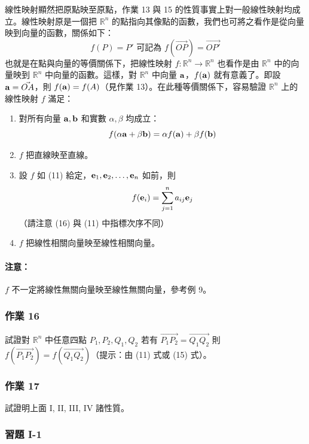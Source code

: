 線性映射顯然把原點映至原點，作業 13 與 15 的性質事實上對一般線性映射均成立。線性映射原是一個把 $\mathbb{R}^n$ 的點指向其像點的函數，我們也可將之看作是從向量映到向量的函數，關係如下：
\[ f(P)=P' \text{ 可記為 } f(\vec{OP}) = \vec{OP'} \]
也就是在點與向量的等價關係下，把線性映射 $f: \mathbb{R}^n \longrightarrow \mathbb{R}^n$ 也看作是由 $\mathbb{R}^n$ 中的向量映到 $\mathbb{R}^n$ 中向量的函數。這樣，對 $\mathbb{R}^n$ 中向量 $\boldsymbol{\mathbf{a}}$，$f(\boldsymbol{\mathbf{a}})$ 就有意義了。即設 $\boldsymbol{\mathbf{a}}=\vec{OA}$，則 $f(\boldsymbol{\mathbf{a}}) = f(A)$（見作業 13）。在此種等價關係下，容易驗證 $\mathbb{R}^n$ 上的線性映射 $f$ 滿足：
\begin{enumerate}[label=\Roman*., leftmargin=2.5em]
  \item 對所有向量 $\boldsymbol{\mathbf{a}}, \boldsymbol{\mathbf{b}}$ 和實數 $\alpha, \beta$ 均成立：
  \begin{equation}
  f(\alpha\boldsymbol{\mathbf{a}} + \beta\boldsymbol{\mathbf{b}}) = \alpha f(\boldsymbol{\mathbf{a}}) + \beta f(\boldsymbol{\mathbf{b}}) \label{eq:b6-1-1-15}
  \end{equation}
  \item $f$ 把直線映至直線。
  \item 設 $f$ 如 (11) 給定，$\boldsymbol{\mathbf{e}}_1, \boldsymbol{\mathbf{e}}_2, \dots, \boldsymbol{\mathbf{e}}_n$ 如前，則
  \begin{equation}
  f(\boldsymbol{\mathbf{e}}_i) = \sum_{j=1}^n a_{ij} \boldsymbol{\mathbf{e}}_j \label{eq:b6-1-1-16}
  \end{equation}
  （請注意 (16) 與 (11) 中指標次序不同）
  \item $f$ 把線性相關向量映至線性相關向量。
\end{enumerate}

\paragraph{注意：}$f$ 不一定將線性無關向量映至線性無關向量，參考例 9。

\subsubsection*{作業 16}\label{hw:b6-1-16}
試證對 $\mathbb{R}^n$ 中任意四點 $P_1, P_2, Q_1, Q_2$ 若有 $\vec{P_1P_2} = \vec{Q_1Q_2}$ 則 $f(\vec{P_1P_2}) = f(\vec{Q_1Q_2})$（提示：由 (11) 式或 (15) 式）。

\subsubsection*{作業 17}\label{hw:b6-1-17}
試證明上面 I, II, III, IV 諸性質。

\subsubsection*{習題 I-1}\label{sec:b6-ex1-1}


